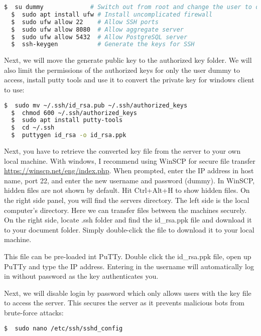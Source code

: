 \begin{lstlisting}[language=bash]
  $  su dummy             # Switch out from root and change the user to dummy
  $  sudo apt install ufw # Install uncomplicated firewall
  $  sudo ufw allow 22    # Allow SSH ports
  $  sudo ufw allow 8080  # Allow aggregate server
  $  sudo ufw allow 5432  # Allow PostgreSQL server
  $  ssh-keygen           # Generate the keys for SSH

\end{lstlisting}

\noindent
Next, we will move the generate public key to the authorized key folder. We will also limit the permissions of the authorized keys for only the user dummy to access, install putty tools and use it to convert the private key for windows client to use:

\begin{lstlisting}[language=bash]
  $  sudo mv ~/.ssh/id_rsa.pub ~/.ssh/authorized_keys
  $  chmod 600 ~/.ssh/authorized_keys
  $  sudo apt install putty-tools
  $  cd ~/.ssh
  $  puttygen id_rsa -o id_rsa.ppk

\end{lstlisting}

\noindent
Next, you have to retrieve the converted key file from the server to your own local machine. With windows, I recommend using WinSCP for secure file transfer \url{https://winscp.net/eng/index.php}. When prompted, enter the IP address in host name, port 22, and enter the new username and password (dummy). In WinSCP, hidden files are not shown by default. Hit Ctrl+Alt+H to show hidden files. On the right side panel, you will find the servers directory. The left side is the local computer's directory. Here we can transfer files between the machines securely. On the right side, locate .ssh folder and find the id\_rsa.ppk file and download it to your document folder. Simply double-click the file to download it to your local machine.

\noindent
This file can be pre-loaded int PuTTy. Double click the id\_rsa.ppk file, open up PuTTy and type the IP address. Entering in the username will automatically log in without password as the key authenticates you.

\noindent
Next, we will disable login by password which only allows users with the key file to access the server. This secures the server as it prevents malicious bots from brute-force attacks:

\begin{lstlisting}[language=bash]
  $  sudo nano /etc/ssh/sshd_config
\end{lstlisting}

